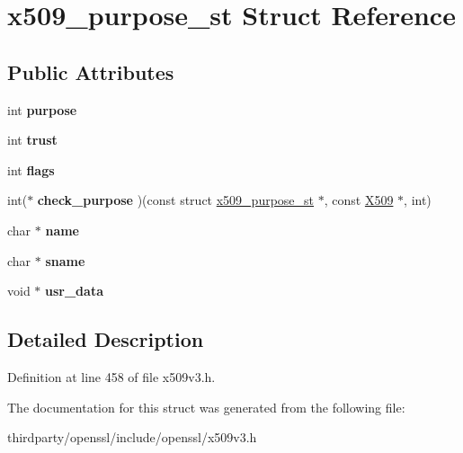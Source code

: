 \hypertarget{structx509__purpose__st}{}\section{x509\+\_\+purpose\+\_\+st Struct Reference}
\label{structx509__purpose__st}
\subsection*{Public Attributes}
\begin{DoxyCompactItemize}
\item 
\mbox{\label{structx509__purpose__st_ad1f43f5b4f7cd5114e7c987b5d485a42}} 
int {\bfseries purpose}
\item 
\mbox{\label{structx509__purpose__st_a2033355e7111f867d6727e2da3e92716}} 
int {\bfseries trust}
\item 
\mbox{\label{structx509__purpose__st_ad058e4594818ca6291ac4a69586c302b}} 
int {\bfseries flags}
\item 
\mbox{\label{structx509__purpose__st_ab424957e81af589729dc0166335c8977}} 
int($\ast$ {\bfseries check\+\_\+purpose} )(const struct \hyperlink{structx509__purpose__st}{x509\+\_\+purpose\+\_\+st} $\ast$, const \hyperlink{structx509__st}{X509} $\ast$, int)
\item 
\mbox{\label{structx509__purpose__st_a736be2bbe6bd7c8def80d9c42efb918f}} 
char $\ast$ {\bfseries name}
\item 
\mbox{\label{structx509__purpose__st_ada906ff4bac6b5b675a7e325e7424bc5}} 
char $\ast$ {\bfseries sname}
\item 
\mbox{\label{structx509__purpose__st_a50555ed3f80ed1a0bfed457c7649c600}} 
void $\ast$ {\bfseries usr\+\_\+data}
\end{DoxyCompactItemize}


\subsection{Detailed Description}


Definition at line 458 of file x509v3.\+h.



The documentation for this struct was generated from the following file\+:\begin{DoxyCompactItemize}
\item 
thirdparty/openssl/include/openssl/x509v3.\+h\end{DoxyCompactItemize}
